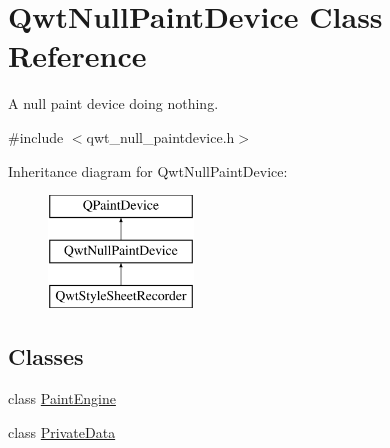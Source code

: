 \hypertarget{class_qwt_null_paint_device}{\section{Qwt\-Null\-Paint\-Device Class Reference}
\label{class_qwt_null_paint_device}
}


A null paint device doing nothing.  




{\ttfamily \#include $<$qwt\-\_\-null\-\_\-paintdevice.\-h$>$}

Inheritance diagram for Qwt\-Null\-Paint\-Device\-:\begin{figure}[H]
\begin{center}
\leavevmode
\includegraphics[height=3.000000cm]{class_qwt_null_paint_device}
\end{center}
\end{figure}
\subsection*{Classes}
\begin{DoxyCompactItemize}
\item 
class \hyperlink{class_qwt_null_paint_device_1_1_paint_engine}{Paint\-Engine}
\item 
class \hyperlink{class_qwt_null_paint_device_1_1_private_data}{Private\-Data}
\end{DoxyCompactItemize}
